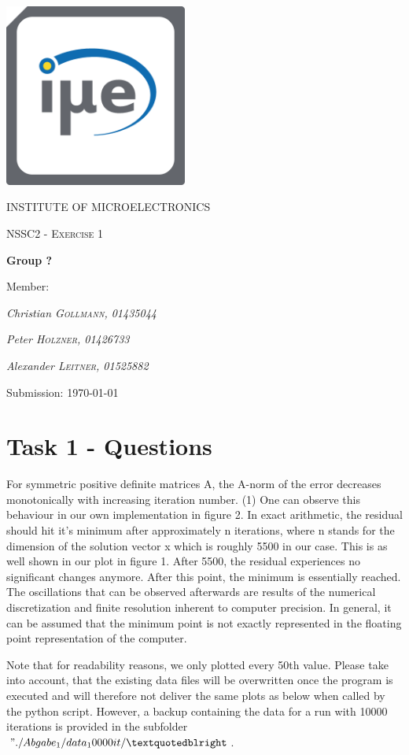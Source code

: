 \documentclass[11pt,a4paper]{article}
\begin{document}
\begin{titlepage}
	\centering
	\begin{center}
	\includegraphics[width=6cm]{Bilder/IuE-Logo.png}
	\end{center}
	{\scshape\LARGE INSTITUTE OF MICROELECTRONICS\par}
	\vspace{1cm}
	{\scshape\Large NSSC2 - Exercise 1\par}
	\vspace{1.5cm}
	{\huge\bfseries Group ?\par}
	\vspace{2cm}
	Member:\par
	{\Large\itshape Christian \textsc{Gollmann, 01435044}\par}
	{\Large\itshape Peter \textsc{Holzner, 01426733}\par}
	{\Large\itshape Alexander \textsc{Leitner, 01525882}\par}
	\vspace{1.5cm}
	Submission: \today\par
	\vfill
\end{titlepage}
\tableofcontents 
\thispagestyle{empty}
\newpage
\setcounter{page}{1}
\section{Task 1 - Questions}
For symmetric positive definite matrices A, the A-norm of the error decreases monotonically with increasing iteration number. (1) One can observe this behaviour in our own implementation in figure 2. In exact arithmetic, the residual should hit it’s minimum after approximately n iterations, where n stands for the dimension of the solution vector x which is roughly 5500 in our case. This is as well shown in our plot in figure 1. After 5500, the residual experiences no significant changes anymore. After this point, the minimum is essentially reached. The oscillations that can be observed afterwards are results of the numerical discretization and finite resolution inherent to computer precision. In general, it can be assumed that the minimum point is not exactly represented in the floating point representation of the computer.
\par
Note that for readability reasons, we only plotted every 50th value. Please take into account, that the existing data files will be overwritten once the program is executed and will therefore not deliver the same plots as below when called by the python script. However, a backup containing the data for a run with 10000 iterations is provided in the subfolder $"./Abgabe_1/data_10000it/”$.
\end{document}
